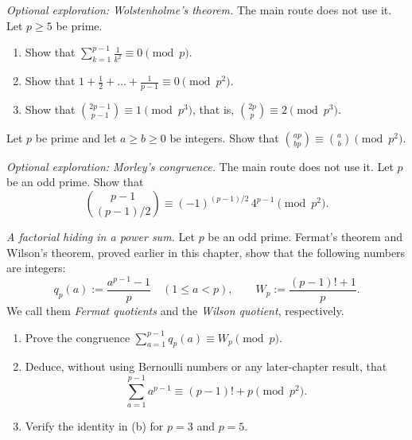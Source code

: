 \begin{exercise}[$\star\star\star$]\label{pb:wolsten}
\emph{Optional exploration: Wolstenholme's theorem.} The main route does not use it. Let $p\ge5$ be prime.
\begin{enumerate}[label=(\alph*)]
\item Show that $\sum_{k=1}^{p-1}\frac1{k^2}\equiv0\pmod p$.
\item Show that $1+\frac12+\dots+\frac1{p-1}\equiv0\pmod{p^2}$.
\item Show that $\binom{2p-1}{p-1}\equiv1\pmod{p^3}$, that is, $\binom{2p}p\equiv2\pmod{p^3}$.
\end{enumerate}
\end{exercise}

\begin{exercise}[$\star\star$]\label{pb:jacobsthal}
Let $p$ be prime and let $a\ge b\ge0$ be integers. Show that $\binom{ap}{bp}\equiv\binom ab\pmod{p^2}$.
\end{exercise}

\begin{exercise}[$\star\star\star$]\label{pb:morley}
\emph{Optional exploration: Morley's congruence.} The main route does not use it. Let $p$ be an odd prime. Show that
\[
\binom{p-1}{(p-1)/2}\equiv(-1)^{(p-1)/2}\,4^{p-1}\pmod{p^2}.
\]
\end{exercise}

\begin{exercise}[$\star\star\star$]\label{pb:glaisher}
\emph{A factorial hiding in a power sum.}
Let $p$ be an odd prime. Fermat's theorem and Wilson's theorem,
proved earlier in this chapter, show that the following
numbers are integers:
\[
q_p(a):=\frac{a^{p-1}-1}{p}\quad(1\le a<p),
\qquad
W_p:=\frac{(p-1)!+1}{p}.
\]
We call them \emph{Fermat quotients} and the
\emph{Wilson quotient}, respectively.
\begin{enumerate}[label=(\alph*)]
\item Prove the congruence
$\displaystyle\sum_{a=1}^{p-1}q_p(a)\equiv W_p\pmod p$.
\item Deduce, without using Bernoulli numbers or any later-chapter
result, that
\[
\sum_{a=1}^{p-1}a^{p-1}\equiv(p-1)!+p\pmod{p^2}.
\]
\item Verify the identity in (b) for $p=3$ and $p=5$.
\end{enumerate}
\end{exercise}


